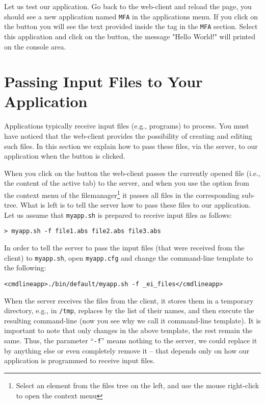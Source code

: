Let us test our application. Go back to the web-client and reload the
page, you should see a new application named \texttt{MFA} in the
applications menu. If you click on the \helpbutton button you will see
the text provided inside the  tag in the \texttt{MFA}
section.
%
Select this application and click on the \applybutton button, the
message "Hello World!" will printed on the console area.


\section{Passing Input Files to Your Application}

Applications typically receive input files (e.g., programs) to
process. You must have noticed that the web-client provides the
possibility of creating and editing such files.  In this section we
explain how to pass these files, via the server, to our application
when the \applybutton button is clicked.

When you click on the \applybutton button the web-client passes the
currently opened file (i.e., the content of the active tab) to the
server, and when you use the \applybutton option from the context menu
of the filemanager\footnote{Select an element from the files tree on
  the left, and use the mouse right-click to open the context menu} it
passes all files in the corresponding sub-tree.
%
What is left is to tell the server how to pass these files to our
application. Let us assume that \texttt{myapp.sh} is prepared to
receive input files as follows:

\medskip
\begin{lstlisting}
> myapp.sh -f file1.abs file2.abs file3.abs
\end{lstlisting}

\medskip 
\noindent
In order to tell the server to pass the input files (that were
received from the client) to \texttt{myapp.sh}, open
\texttt{myapp.cfg} and change the command-line template to the
following:

\medskip
\begin{lstlisting}
<cmdlineapp>./bin/default/myapp.sh -f _ei_files</cmdlineapp>
\end{lstlisting}

\medskip
\noindent
When the server receives the files from the client, it stores them in
a temporary directory, e.g., in \texttt{/tmp}, replaces 
by the list of their names, and then execute the resulting
command-line (now you see why we call it command-line template).
%
It is important to note that only  changes in the above
template, the rest remain the same. Thus, the parameter
``\texttt{-f}'' means nothing to the server, we could replace it by
anything else or even completely remove it -- that depends only on how
our application is programmed to receive input files.

